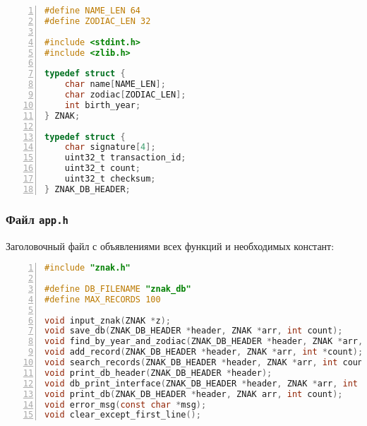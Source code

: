 \begin{lstlisting}[language=C, numbers=left, caption=znak.h]
#define NAME_LEN 64
#define ZODIAC_LEN 32

#include <stdint.h>
#include <zlib.h>

typedef struct {
    char name[NAME_LEN];
    char zodiac[ZODIAC_LEN];
    int birth_year;
} ZNAK;

typedef struct {
    char signature[4];
    uint32_t transaction_id;
    uint32_t count;
    uint32_t checksum;
} ZNAK_DB_HEADER;
\end{lstlisting}

\subsubsection*{Файл \texttt{app.h}}

Заголовочный файл с объявлениями всех функций и необходимых констант:

\begin{lstlisting}[language=C, numbers=left, caption=app.h]
#include "znak.h"

#define DB_FILENAME "znak_db"
#define MAX_RECORDS 100

void input_znak(ZNAK *z);
void save_db(ZNAK_DB_HEADER *header, ZNAK *arr, int count);
void find_by_year_and_zodiac(ZNAK_DB_HEADER *header, ZNAK *arr, int count, const char *zodiac, int year);
void add_record(ZNAK_DB_HEADER *header, ZNAK *arr, int *count);
void search_records(ZNAK_DB_HEADER *header, ZNAK *arr, int count);
void print_db_header(ZNAK_DB_HEADER *header);
void db_print_interface(ZNAK_DB_HEADER *header, ZNAK *arr, int count);
void print_db(ZNAK_DB_HEADER *header, ZNAK arr, int count);
void error_msg(const char *msg);
void clear_except_first_line();
\end{lstlisting}

